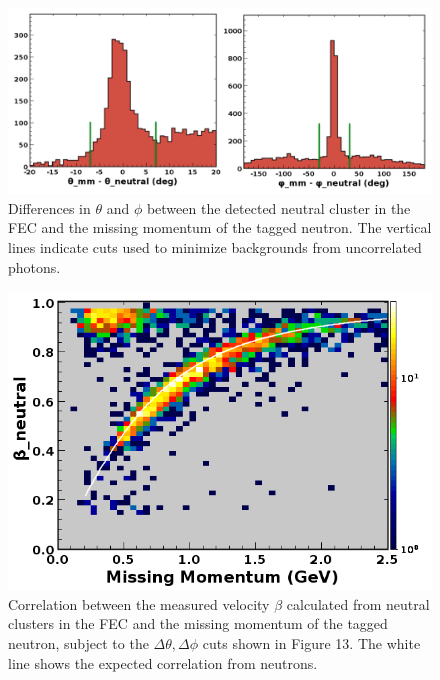 \begin{figure}[hbt]
\centering
\includegraphics[width=1.0\columnwidth,keepaspectratio]{img/S10_4_1.png}
\caption[]{Differences in $\theta$ and $\phi$ between the detected neutral cluster in the FEC and the missing momentum of the tagged neutron.  The vertical lines indicate cuts used to minimize backgrounds from uncorrelated photons.}
\label{fig:S10_4_1}
\end{figure}

\begin{figure}[hbt]
\centering
\includegraphics[width=1.0\columnwidth,keepaspectratio]{img/S10_4_2.png}
\caption[]{Correlation between the measured velocity $\beta$ calculated from neutral clusters in the FEC and the missing momentum of the tagged neutron, subject to the $\Delta\theta,\Delta\phi$ cuts shown in Figure 13.  The white line shows the expected correlation from neutrons.}
\label{fig:S10_4_2}
\end{figure}






